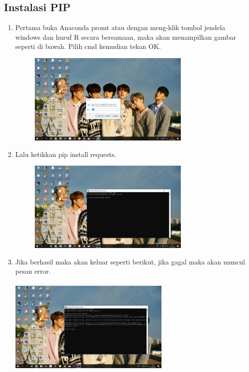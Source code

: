 \documentclass{article}
\begin{document}
\subsection{Instalasi PIP}
\begin{enumerate}
    \item Pertama buka Anaconda promt atau dengan meng-klik tombol jendela windows dan huruf R secara bersamaan, maka akan menampilkan gambar seperti di bawah. Pilih cmd kemudian tekan OK.
        \begin{figure}[h]
            \centerline{\includegraphics[width=8cm]{image/cmd.png}}
        \end{figure}
    \item Lalu ketikkan pip install requests.
        \begin{figure}[h]
            \centerline{\includegraphics[width=8cm]{image/pip.png}}
        \end{figure}
    \item Jika berhasil maka akan keluar seperti berikut, jika gagal maka akan muncul pesan error.
            \paragraph{}
            \centerline{\includegraphics[width=8cm]{image/pipberhasil.png}}
\end{enumerate}
\end{document}
